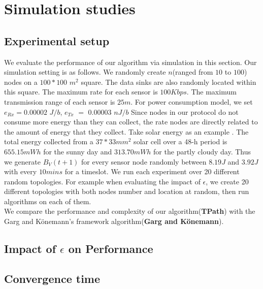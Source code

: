 \documentclass{article}
\begin{document}
\section{Simulation studies}
\subsection{Experimental setup}
We evaluate the performance of our algorithm via simulation in this section.
Our simulation setting is as follows. We randomly create $n$(ranged from $10$ to $100$) nodes
on a $100*100$ $m^2$ square. The data sinks are also randomly located within this square. The maximum rate for each sensor is $100 Kbps$. The maximum transmission range of each sensor is $25 m$. For power consumption model, we set $e_{Rx} = 0.00002$ $J/b$, $e_{Tx}$ $=$ $0.00003$ $nJ/b$ Since nodes in our protocol do not 
consume more energy than they can collect, the rate nodes are directly related to the amount of energy that they collect. Take solar energy as an example . The total energy collected from a $37 * 33 mm^2$ solar cell over a 48-h period is $655.15 mWh$ for the sunny day and $313.70 mWh$ for the partly cloudy day. Thus we generate $B_V(t+1)$ for every sensor node randomly between $8.19 J$ and $3.92 J$ with every $10 mins$ for a timeslot. We run each experiment over 20 different random topologies. For example when evaluating the impact of $\epsilon$, we create 20 different topologies with both nodes number and location at random, then run algorithms on each of them.\\
We compare the performance and complexity of our algorithm(\textbf{TPath}) with the Garg and K\"{o}nemann's framework algorithm(\textbf{Garg and K\"{o}nemann}).

\subsection{Impact of $\epsilon$ on Performance}

\subsection{Convergence time}
\end{document}
